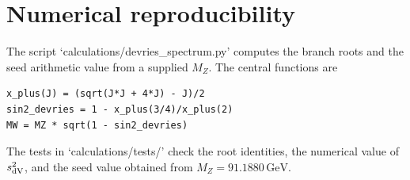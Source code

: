 \section{Numerical reproducibility}
\label{app:numerics}

The script `calculations/devries\_spectrum.py' computes the branch roots and the seed arithmetic value from a supplied \(M_Z\).  The central functions are
\begin{verbatim}
x_plus(J) = (sqrt(J*J + 4*J) - J)/2
sin2_devries = 1 - x_plus(3/4)/x_plus(2)
MW = MZ * sqrt(1 - sin2_devries)
\end{verbatim}
The tests in `calculations/tests/' check the root identities, the numerical
value of \(s^2_{\rm dV}\), and the seed value obtained from
\(M_Z=91.1880\,\mathrm{GeV}\).

